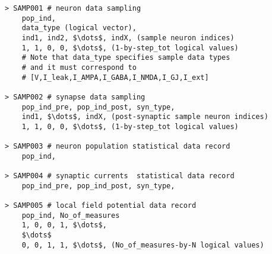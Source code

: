 \documentclass{article}
\begin{document}
\begin{lstlisting}[mathescape]
> SAMP001 # neuron data sampling 
	pop_ind,
	data_type (logical vector),
	ind1, ind2, $\dots$, indX, (sample neuron indices)
	1, 1, 0, 0, $\dots$, (1-by-step_tot logical values)
	# Note that data_type specifies sample data types
	# and it must correspond to 
	# [V,I_leak,I_AMPA,I_GABA,I_NMDA,I_GJ,I_ext]

> SAMP002 # synapse data sampling 
	pop_ind_pre, pop_ind_post, syn_type,
	ind1, $\dots$, indX, (post-synaptic sample neuron indices)
	1, 1, 0, 0, $\dots$, (1-by-step_tot logical values)
	
> SAMP003 # neuron population statistical data record
	pop_ind,
	
> SAMP004 # synaptic currents  statistical data record
	pop_ind_pre, pop_ind_post, syn_type,

> SAMP005 # local field potential data record
	pop_ind, No_of_measures
	1, 0, 0, 1, $\dots$, 
	$\dots$
	0, 0, 1, 1, $\dots$, (No_of_measures-by-N logical values)
	
\end{lstlisting}
\end{document}
